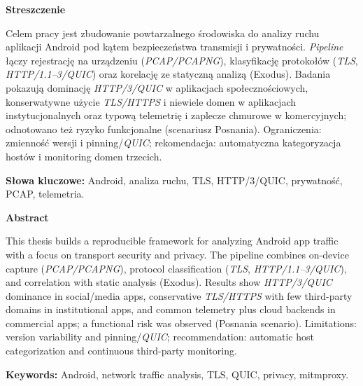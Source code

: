 \clearpage
\thispagestyle{plain} %
\vspace*{\fill}

\begin{center}

  {\Large\bfseries Streszczenie\par}
  \vspace{0.6\baselineskip}
  \begin{minipage}{0.85\textwidth}
    \small
    \noindent
  Celem pracy jest zbudowanie powtarzalnego środowiska do analizy ruchu aplikacji Android pod kątem bezpieczeństwa transmisji i prywatności. \emph{Pipeline} łączy rejestrację na urządzeniu (\emph{PCAP/PCAPNG}), klasyfikację protokołów (\emph{TLS}, \emph{HTTP/1.1–3/QUIC}) oraz korelację ze statyczną analizą (Exodus). Badania pokazują dominację \emph{HTTP/3/QUIC} w aplikacjach społecznościowych, konserwatywne użycie \emph{TLS/HTTPS} i niewiele domen w aplikacjach instytucjonalnych oraz typową telemetrię i zaplecze chmurowe w komercyjnych; odnotowano też ryzyko funkcjonalne (scenariusz Posnania). Ograniczenia: zmienność wersji i pinning/\emph{QUIC}; rekomendacja: automatyczna kategoryzacja hostów i monitoring domen trzecich.
    
    \medskip
    \noindent\textbf{Słowa kluczowe:} Android, analiza ruchu, TLS, HTTP/3/QUIC, prywatność, PCAP, telemetria.
  \end{minipage}

  \vspace{10\baselineskip}

  {\Large\bfseries Abstract\par}
  \vspace{0.6\baselineskip}
  \begin{minipage}{0.85\textwidth}
    \small
    \noindent
  This thesis builds a reproducible framework for analyzing Android app traffic with a focus on transport security and privacy. The pipeline combines on-device capture (\emph{PCAP/PCAPNG}), protocol classification (\emph{TLS}, \emph{HTTP/1.1–3/QUIC}), and correlation with static analysis (Exodus). Results show \emph{HTTP/3/QUIC} dominance in social/media apps, conservative \emph{TLS/HTTPS} with few third-party domains in institutional apps, and common telemetry plus cloud backends in commercial apps; a functional risk was observed (Posnania scenario). Limitations: version variability and pinning/\emph{QUIC}; recommendation: automatic host categorization and continuous third-party monitoring.
    
    \medskip
    \noindent\textbf{Keywords:} Android, network traffic analysis, TLS, QUIC, privacy, mitmproxy.
  \end{minipage}

\end{center}

\vspace*{\fill}
\clearpage
